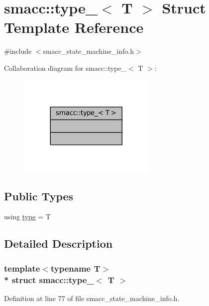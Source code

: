 \hypertarget{structsmacc_1_1type__}{}\section{smacc\+:\+:type\+\_\+$<$ T $>$ Struct Template Reference}
\label{structsmacc_1_1type__}


{\ttfamily \#include $<$smacc\+\_\+state\+\_\+machine\+\_\+info.\+h$>$}



Collaboration diagram for smacc\+:\+:type\+\_\+$<$ T $>$\+:
\nopagebreak
\begin{figure}[H]
\begin{center}
\leavevmode
\includegraphics[width=188pt]{structsmacc_1_1type____coll__graph}
\end{center}
\end{figure}
\subsection*{Public Types}
\begin{DoxyCompactItemize}
\item 
using \hyperlink{structsmacc_1_1type___a9b8fcdd94d0e9fc71366e867a4094463}{type} = T
\end{DoxyCompactItemize}


\subsection{Detailed Description}
\subsubsection*{template$<$typename T$>$\\*
struct smacc\+::type\+\_\+$<$ T $>$}



Definition at line 77 of file smacc\+\_\+state\+\_\+machine\+\_\+info.\+h.



